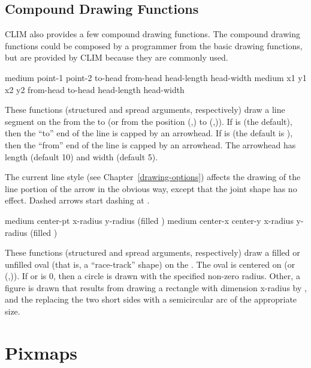 \subsection {Compound Drawing Functions}

CLIM also provides a few compound drawing functions.  The compound drawing
functions could be composed by a programmer from the basic drawing functions,
but are provided by CLIM because they are commonly used.

  {medium point-1 point-2 \key \DrawingOptions \LineCapOptions
                      to-head from-head head-length head-width}
 {medium x1 y1 x2 y2 \key \DrawingOptions \LineCapOptions
                      from-head to-head head-length head-width}

These functions (structured and spread arguments, respectively) draw a line
segment on the   from the   to
 (or from the position (,) to (,)).
If  is  (the default), then the ``to'' end of the line
is capped by an arrowhead.  If  is  (the default is
), then the ``from'' end of the line is capped by an arrowhead.  The
arrowhead has length  (default 10) and width 
(default 5).

The current line style (see Chapter~\ref{drawing-options}) affects the drawing
of the line portion of the arrow in the obvious way, except that the joint shape
has no effect.  Dashed arrows start dashing at .


  {medium center-pt x-radius y-radius \key (filled )
                     \DrawingOptions \LineCapOptions}
 {medium center-x center-y x-radius y-radius \key (filled )
                     \DrawingOptions \LineCapOptions}

These functions (structured and spread arguments, respectively) draw a filled or
unfilled oval (that is, a ``race-track'' shape) on the  .
The oval is centered on  (or (,)).
If  or  is $0$, then a circle is drawn with the
specified non-zero radius.  Other, a figure is drawn that results from drawing a
rectangle with dimension {x-radius} by , and the replacing the two
short sides with a semicircular arc of the appropriate size.


\section {Pixmaps}

